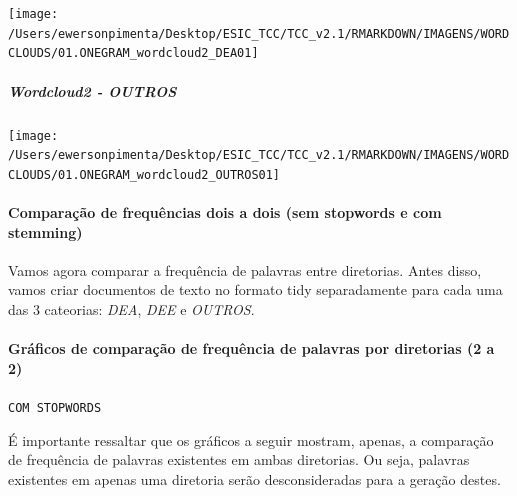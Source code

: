 \documentclass[]{article}
\newenvironment{Shaded}{\begin{snugshade}}{\end{snugshade}}
\newcommand{\KeywordTok}[1]{\textcolor[rgb]{0.13,0.29,0.53}{\textbf{#1}}}
\newcommand{\DataTypeTok}[1]{\textcolor[rgb]{0.13,0.29,0.53}{#1}}
\newcommand{\StringTok}[1]{\textcolor[rgb]{0.31,0.60,0.02}{#1}}
\newcommand{\CommentTok}[1]{\textcolor[rgb]{0.56,0.35,0.01}{\textit{#1}}}
\newcommand{\OperatorTok}[1]{\textcolor[rgb]{0.81,0.36,0.00}{\textbf{#1}}}
\newcommand{\NormalTok}[1]{#1}
\let\oldparagraph\paragraph
\renewcommand{\paragraph}[1]{\oldparagraph{#1}\mbox{}}
\let\oldsubparagraph\subparagraph
\renewcommand{\subparagraph}[1]{\oldsubparagraph{#1}\mbox{}}
\begin{document}
\texttt{[image: /Users/ewersonpimenta/Desktop/ESIC\_TCC/TCC\_v2.1/RMARKDOWN/IMAGENS/WORDCLOUDS/01.ONEGRAM\_wordcloud2\_DEA01]}

\subparagraph{Wordcloud2 - OUTROS}\label{wordcloud2---outros}

\begin{Shaded}
\end{Shaded}

\texttt{[image: /Users/ewersonpimenta/Desktop/ESIC\_TCC/TCC\_v2.1/RMARKDOWN/IMAGENS/WORDCLOUDS/01.ONEGRAM\_wordcloud2\_OUTROS01]}

\paragraph{Comparação de frequências dois a dois (sem stopwords e com
stemming)}\label{comparacao-de-frequencias-dois-a-dois-sem-stopwords-e-com-stemming}

Vamos agora comparar a frequência de palavras entre diretorias. Antes
disso, vamos criar documentos de texto no formato tidy separadamente
para cada uma das 3 cateorias: \emph{DEA}, \emph{DEE} e \emph{OUTROS}.

\paragraph{Gráficos de comparação de frequência de palavras por
diretorias (2 a
2)}\label{graficos-de-comparacao-de-frequencia-de-palavras-por-diretorias-2-a-2}

\texttt{COM\ STOPWORDS}

É importante ressaltar que os gráficos a seguir mostram, apenas, a
comparação de frequência de palavras existentes em ambas diretorias. Ou
seja, palavras existentes em apenas uma diretoria serão desconsideradas
para a geração destes.

\begin{Shaded}
\end{Shaded}
\end{document}
